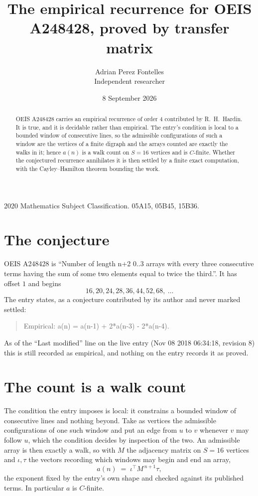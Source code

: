 \documentclass[11pt,a4paper]{article}
\title{The empirical recurrence for OEIS A248428, proved by transfer matrix}
\author{Adrian Perez Fontelles\\ \small Independent researcher}
\date{8 September 2026}
\theoremstyle{plain}
\theoremstyle{definition}
\begin{document}
\maketitle

\begin{abstract}
OEIS A248428 carries an empirical recurrence of order $4$ contributed by R.~H.~Hardin. It is
true, and it is decidable rather than empirical. The entry's condition is local to a bounded window of consecutive lines, so
the admissible configurations of such a window are the vertices of a finite digraph and the
arrays counted are exactly the walks in it; hence $a(n)$ is a walk count on $S=16$ vertices
and is $C$-finite. Whether the conjectured recurrence annihilates it is then settled by a
finite exact computation, with the Cayley--Hamilton theorem bounding the work.
\end{abstract}

\noindent\small 2020 Mathematics Subject Classification. 05A15, 05B45, 15B36.\normalsize

\section{The conjecture}

OEIS A248428 is ``Number of length n+2 0..3 arrays with every three consecutive terms having the sum of some two elements equal to twice the third.''. It has offset $1$ and begins
\[
16, 20, 24, 28, 36, 44, 52, 68,\ \dots
\]
The entry states, as a conjecture contributed by its author and never marked settled:
\begin{quote}
Empirical: a(n) = a(n-1) + 2*a(n-3) - 2*a(n-4).
\end{quote}
As of the ``Last modified'' line on the live entry (Nov 08 2018 06:34:18, revision 8) this is still
recorded as empirical, and nothing on the entry records it as proved.

\section{The count is a walk count}

The condition the entry imposes is local: it constrains a bounded window of consecutive lines and nothing beyond. Take as
vertices the admissible configurations of one such window and put an edge from $u$ to $v$
whenever $v$ may follow $u$, which the condition decides by inspection of the two. An
admissible array is then exactly a walk, so with $M$ the adjacency matrix on $S=16$ vertices
and $\iota,\tau$ the vectors recording which windows may begin and end an array,
\[
a(n)\;=\;\iota^{\!\top}M^{\,n+1}\tau ,
\]
the exponent fixed by the entry's own shape and checked against its published terms. In
particular $a$ is $C$-finite.
\end{document}
